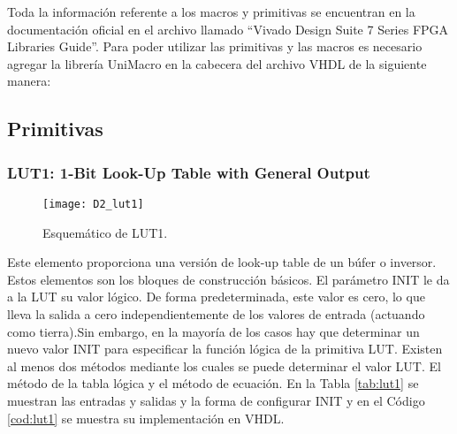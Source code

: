         Toda la información referente a los macros y primitivas se encuentran en la documentación oficial en el archivo llamado ``Vivado Design Suite 7 Series FPGA Libraries Guide''. Para poder utilizar las primitivas y las macros es necesario agregar la librería UniMacro en la cabecera del archivo VHDL de la siguiente manera: 

        \vspace{0.4cm}
        

	    \subsection{Primitivas}

		    \subsubsection{LUT1: 1-Bit Look-Up Table with General Output}
	
                \begin{figure}[hbtp]
                    \caption{Esquemático de LUT1.}
                    \centering
                    \texttt{[image: D2\_lut1]}
                    \label{fig:D2_lut1}
                \end{figure}	
	
                Este elemento proporciona una versión de look-up table de un búfer o inversor. Estos elementos son los bloques de construcción básicos. El parámetro INIT le da a la LUT su valor lógico. De forma predeterminada, este valor es cero, lo que lleva la salida a cero independientemente de los valores de entrada (actuando como tierra).Sin embargo, en la mayoría de los casos hay que determinar un nuevo valor INIT para especificar la función lógica de la primitiva LUT. Existen al menos dos métodos mediante los cuales se puede determinar el valor LUT. El método de la tabla lógica y el método de ecuación. En la Tabla \ref{tab:lut1} se muestran las entradas y salidas y la forma de configurar INIT y en el Código \ref{cod:lut1} se muestra su implementación en VHDL.

